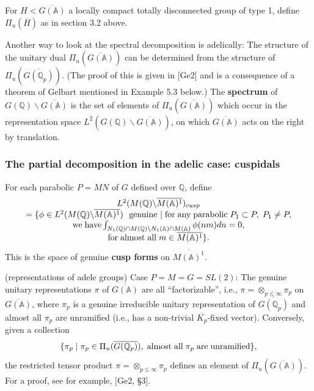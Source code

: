 For $H<\overline{G({\mathbb{A}})}$ a locally
compact totally disconnected group of
type 1, define $\Pi_u(\overline{H})$ as in section 3.2 above.

Another way to look at the spectral decomposition
is adelically: The structure of the
unitary dual $\Pi_u(\overline{G({\mathbb{A}})})$ can be determined from the
structure of $\Pi_u(\overline{G({\mathbb{Q}}_p)})$.
(The proof of this is given in
[Ge2] and is a consequence of a theorem of Gelbart
mentioned in Example 5.3 below.) The {\bf
spectrum} of $G({\mathbb{Q}} )\backslash \overline{G({\mathbb{A}})}$ is the set of
elements of $\Pi_u(\overline{G({\mathbb{A}})})$
which occur in the representation
space $L^2(G({{\mathbb{Q}}} )\backslash \overline{G({\mathbb{A}})})$, on which
$\overline{G({\mathbb{A}})}$ acts on the right by translation.

\subsubsection{The partial decomposition in the adelic case: cuspidals}

For each parabolic $P=MN$ of $G$ defined over ${\mathbb{Q}}$, define 
\begin{equation}
\begin{array}{c}
L^2(M({\mathbb{Q}})\backslash \overline{M({\mathbb{A}})^1})_{cusp} \\ 
=\{\phi \in L^2(M({{\mathbb{Q}}})\backslash \overline{M({\mathbb{A}})^1})
\ {\rm \ genuine\ }|\;{\rm for\;any\;parabolic}\;
P_1\subset P,\;P_1\neq P, \\ 
{\rm we\;have}
\int_{N_1({\mathbb{Q}})\cap M({\mathbb{Q}})\backslash
N_1({\mathbb{A}})\cap M({\mathbb{A}})}\phi (nm)dn=0, \\ 
{\rm for\;almost\;all}\;m\in \overline{M({\mathbb{A}})^1}\}.
\end{array}
\end{equation}
This is the space of genuine {\bf cusp forms} on
$\overline{M({\mathbb{A}})^1}$.

\begin{example}
(representations of adele groups) {\sf Case} $P=M=G=SL(2)$:
The genuine unitary representations $\pi $ of
$\overline{G({{\mathbb{A}}})}$ are all
``factorizable'', i.e.,
$\pi =\otimes _{p\leq \infty}\pi _p$ on
$\overline{G({{\mathbb{A}}})}$, where
$\pi _p$ is a genuine irreducible unitary representation of
$\overline{G({\mathbb{Q}}_p)}$ and almost all $\pi _p$
are unramified (i.e., has a non-trivial
$\overline{K_p}$-fixed vector). Conversely, given a collection 
\[
\{\pi _p\;|\;\pi _p\in \Pi _u(\overline{G({\mathbb{Q}}_p)}),
\;{\rm almost\;all}\;\pi _p\;{\rm are\;unramified}\},
\]
the restricted tensor product
$\pi =\otimes _{p\leq \infty}\pi _p$
defines an element of $\Pi _u(\overline{G({\mathbb{A}})})$. For a proof,
see for example, [Ge2, \S 3].

\end{example}

